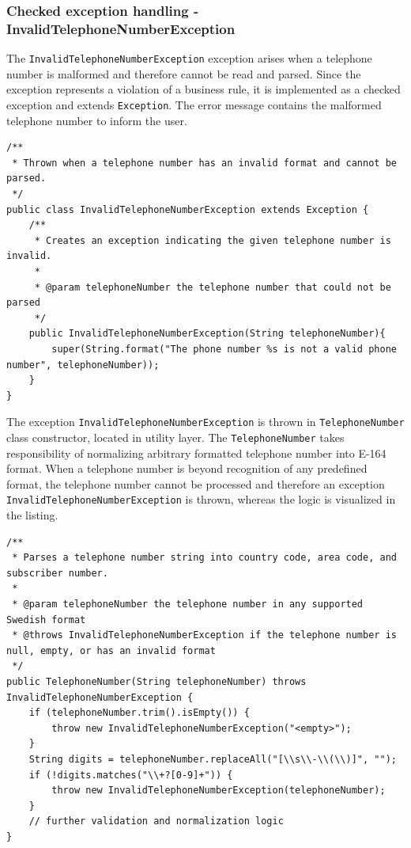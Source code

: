 \documentclass[a4paper]{scrartcl}
\begin{document}
\subsubsection{Checked exception handling - InvalidTelephoneNumberException}

The \texttt{InvalidTelephoneNumberException} exception arises when a telephone number is malformed and therefore cannot be read and parsed. Since the exception represents a violation of a business rule, it is implemented
as a checked exception and extends \texttt{Exception}. The error message contains the malformed telephone number to inform the user. 

\begin{lstlisting}[style=javastyle, caption={InvalidTelephoneNumberException class}]
/**
 * Thrown when a telephone number has an invalid format and cannot be parsed.
 */
public class InvalidTelephoneNumberException extends Exception {
    /**
     * Creates an exception indicating the given telephone number is invalid.
     *
     * @param telephoneNumber the telephone number that could not be parsed
     */
    public InvalidTelephoneNumberException(String telephoneNumber){
        super(String.format("The phone number %s is not a valid phone number", telephoneNumber));
    }
}
\end{lstlisting}

The exception \texttt{InvalidTelephoneNumberException} is thrown in \texttt{TelephoneNumber} class constructor, located in utility layer. The \texttt{TelephoneNumber} takes responsibility of normalizing arbitrary formatted telephone number into E-164 format. When a telephone number is beyond recognition of any predefined format, the telephone number cannot be processed and therefore an exception \texttt{InvalidTelephoneNumberException} is thrown, whereas the logic is visualized in the listing.

\begin{lstlisting}[style=javastyle, caption={TelephoneNumber constructor throwing InvalidTelephoneNumberException}]
/**
 * Parses a telephone number string into country code, area code, and subscriber number.
 *
 * @param telephoneNumber the telephone number in any supported Swedish format
 * @throws InvalidTelephoneNumberException if the telephone number is null, empty, or has an invalid format
 */
public TelephoneNumber(String telephoneNumber) throws InvalidTelephoneNumberException {
    if (telephoneNumber.trim().isEmpty()) {
        throw new InvalidTelephoneNumberException("<empty>");
    }
    String digits = telephoneNumber.replaceAll("[\\s\\-\\(\\)]", "");
    if (!digits.matches("\\+?[0-9]+")) {
        throw new InvalidTelephoneNumberException(telephoneNumber);
    }
    // further validation and normalization logic
}
\end{lstlisting}
\end{document}
